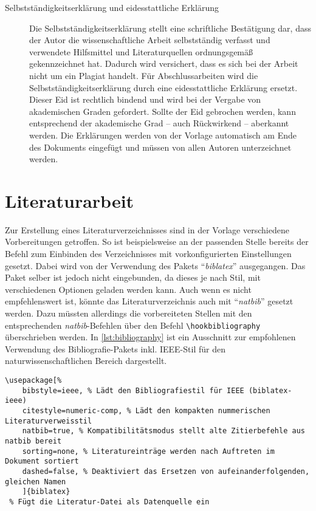\documentclass[
%
	thesis=paper,		%
	compactlistof,		%
	noauthorship,		%
%
	fancy,				%
%
%
]{hsmw-thesis}
\begin{document}
\begin{description}
		\item[Selbstständigkeitserklärung und eidesstattliche Erklärung]\label{itm:soa}
		Die Selbstständigkeitserklärung stellt eine schriftliche Bestätigung dar, dass der Autor die wissenschaftliche Arbeit selbstständig verfasst und verwendete Hilfsmittel und Literaturquellen ordnungsgemäß gekennzeichnet hat.
		Dadurch wird versichert, dass es sich bei der Arbeit nicht um ein Plagiat handelt.
		Für Abschlussarbeiten wird die Selbstständigkeitserklärung durch eine eidesstattliche Erklärung ersetzt.
		Dieser Eid ist rechtlich bindend und wird bei der Vergabe von akademischen Graden gefordert.
		Sollte der Eid gebrochen werden, kann entsprechend der akademische Grad -- auch Rückwirkend -- aberkannt werden.
		Die Erklärungen werden von der Vorlage automatisch am Ende des Dokuments eingefügt und müssen von allen Autoren unterzeichnet werden.
	\end{description}


	
	\chapter{Literaturarbeit}
	\label{cha:bibliography}
	
	Zur Erstellung eines Literaturverzeichnisses sind in der Vorlage verschiedene Vorbereitungen getroffen.
	So ist beispielsweise an der passenden Stelle bereits der Befehl zum Einbinden des Verzeichnisses mit vorkonfigurierten Einstellungen gesetzt.
	Dabei wird von der Verwendung des Pakets \enquote{\textit{biblatex}} ausgegangen.
	Das Paket selber ist jedoch nicht eingebunden, da dieses je nach Stil, mit verschiedenen Optionen geladen werden kann.
	Auch wenn es nicht empfehlenswert ist, könnte das Literaturverzeichnis auch mit \enquote{\textit{natbib}} gesetzt werden.
	Dazu müssten allerdings die vorbereiteten Stellen mit den entsprechenden \textit{natbib}-Befehlen über den Befehl \verb|\hookbibliography| überschrieben werden.
	In \cref{lst:bibliography} ist ein Ausschnitt zur empfohlenen Verwendung des Bibliografie-Pakets inkl. IEEE-Stil für den naturwissenschaftlichen Bereich dargestellt.
	
	\begin{lstlisting}[float=htb,caption={Beispielcode zum Konfigurieren des Literaturverzeichnisses mit dem Paket \textit{biblatex}.},label=lst:bibliography]
\usepackage[%
	bibstyle=ieee, % Lädt den Bibliografiestil für IEEE (biblatex-ieee)
	citestyle=numeric-comp, % Lädt den kompakten nummerischen Literaturverweisstil
	natbib=true, % Kompatibilitätsmodus stellt alte Zitierbefehle aus natbib bereit
	sorting=none, % Literatureinträge werden nach Auftreten im Dokument sortiert
	dashed=false, % Deaktiviert das Ersetzen von aufeinanderfolgenden, gleichen Namen
	]{biblatex}
 % Fügt die Literatur-Datei als Datenquelle ein
	\end{lstlisting}
	
\end{document}
